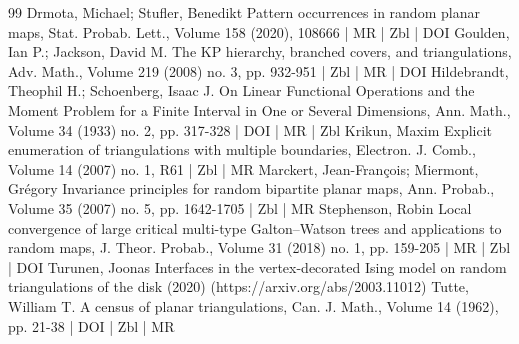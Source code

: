 \begin{thebibliography}{99}
Drmota, Michael; Stufler, Benedikt Pattern occurrences in random planar maps, Stat. Probab. Lett., Volume 158 (2020), 108666 | MR | Zbl | DOI
Goulden, Ian P.; Jackson, David M. The KP hierarchy, branched covers, and triangulations, Adv. Math., Volume 219 (2008) no. 3, pp. 932-951 | Zbl | MR | DOI
Hildebrandt, Theophil H.; Schoenberg, Isaac J. On Linear Functional Operations and the Moment Problem for a Finite Interval in One or Several Dimensions, Ann. Math., Volume 34 (1933) no. 2, pp. 317-328 | DOI | MR | Zbl
Krikun, Maxim Explicit enumeration of triangulations with multiple boundaries, Electron. J. Comb., Volume 14 (2007) no. 1, R61 | Zbl | MR
Marckert, Jean-François; Miermont, Grégory Invariance principles for random bipartite planar maps, Ann. Probab., Volume 35 (2007) no. 5, pp. 1642-1705 | Zbl | MR
Stephenson, Robin Local convergence of large critical multi-type Galton–Watson trees and applications to random maps, J. Theor. Probab., Volume 31 (2018) no. 1, pp. 159-205 | MR | Zbl | DOI
Turunen, Joonas Interfaces in the vertex-decorated Ising model on random triangulations of the disk (2020) (https://arxiv.org/abs/2003.11012)
Tutte, William T. A census of planar triangulations, Can. J. Math., Volume 14 (1962), pp. 21-38 | DOI | Zbl | MR
\end{thebibliography}
